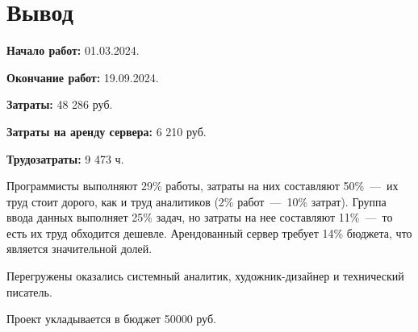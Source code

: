 \chapter*{Вывод}

\textbf{Начало работ:} 01.03.2024. 

\textbf{Окончание работ:} 19.09.2024.

\textbf{Затраты:} 48 286 руб.

\textbf{Затраты на аренду сервера:} 6 210 руб.

\textbf{Трудозатраты:} 9 473 ч.

Программисты выполняют 29\% работы, затраты на них составляют 50\%~---~их труд стоит дорого, как и труд аналитиков (2\% работ~---~10\% затрат). Группа ввода данных выполняет 25\% задач, но затраты на нее составляют 11\%~---~то есть их труд обходится дешевле. Арендованный сервер требует 14\% бюджета, что является значительной долей. 

Перегружены оказались системный аналитик, художник-дизайнер и технический писатель. 

Проект укладывается в бюджет 50000 руб.

